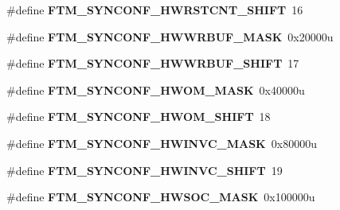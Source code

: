\begin{DoxyCompactItemize}
\item 
\#define {\bfseries F\+T\+M\+\_\+\+S\+Y\+N\+C\+O\+N\+F\+\_\+\+H\+W\+R\+S\+T\+C\+N\+T\+\_\+\+S\+H\+I\+FT}~16\hypertarget{group__FTM__Register__Masks_gae0f2be27abcc3ae202f10bb3d27a4dc7}{}\label{group__FTM__Register__Masks_gae0f2be27abcc3ae202f10bb3d27a4dc7}

\item 
\#define {\bfseries F\+T\+M\+\_\+\+S\+Y\+N\+C\+O\+N\+F\+\_\+\+H\+W\+W\+R\+B\+U\+F\+\_\+\+M\+A\+SK}~0x20000u\hypertarget{group__FTM__Register__Masks_ga6191e61768074435e48f3e3d07076d0f}{}\label{group__FTM__Register__Masks_ga6191e61768074435e48f3e3d07076d0f}

\item 
\#define {\bfseries F\+T\+M\+\_\+\+S\+Y\+N\+C\+O\+N\+F\+\_\+\+H\+W\+W\+R\+B\+U\+F\+\_\+\+S\+H\+I\+FT}~17\hypertarget{group__FTM__Register__Masks_gadad6b0aa720155c8c4b689e63a86466a}{}\label{group__FTM__Register__Masks_gadad6b0aa720155c8c4b689e63a86466a}

\item 
\#define {\bfseries F\+T\+M\+\_\+\+S\+Y\+N\+C\+O\+N\+F\+\_\+\+H\+W\+O\+M\+\_\+\+M\+A\+SK}~0x40000u\hypertarget{group__FTM__Register__Masks_gac4c190aeac6b3ca490b9a693350c6ec6}{}\label{group__FTM__Register__Masks_gac4c190aeac6b3ca490b9a693350c6ec6}

\item 
\#define {\bfseries F\+T\+M\+\_\+\+S\+Y\+N\+C\+O\+N\+F\+\_\+\+H\+W\+O\+M\+\_\+\+S\+H\+I\+FT}~18\hypertarget{group__FTM__Register__Masks_ga64d72753d3b6dee9b83125cfba66b52a}{}\label{group__FTM__Register__Masks_ga64d72753d3b6dee9b83125cfba66b52a}

\item 
\#define {\bfseries F\+T\+M\+\_\+\+S\+Y\+N\+C\+O\+N\+F\+\_\+\+H\+W\+I\+N\+V\+C\+\_\+\+M\+A\+SK}~0x80000u\hypertarget{group__FTM__Register__Masks_ga84bc991db330a6933bc0a3b89ed8b85f}{}\label{group__FTM__Register__Masks_ga84bc991db330a6933bc0a3b89ed8b85f}

\item 
\#define {\bfseries F\+T\+M\+\_\+\+S\+Y\+N\+C\+O\+N\+F\+\_\+\+H\+W\+I\+N\+V\+C\+\_\+\+S\+H\+I\+FT}~19\hypertarget{group__FTM__Register__Masks_gae14e244f2072efc59ef7919e4675a988}{}\label{group__FTM__Register__Masks_gae14e244f2072efc59ef7919e4675a988}

\item 
\#define {\bfseries F\+T\+M\+\_\+\+S\+Y\+N\+C\+O\+N\+F\+\_\+\+H\+W\+S\+O\+C\+\_\+\+M\+A\+SK}~0x100000u\hypertarget{group__FTM__Register__Masks_ga87dd113da8487aa3082d39baeb54874d}{}\label{group__FTM__Register__Masks_ga87dd113da8487aa3082d39baeb54874d}


\end{DoxyCompactItemize}
